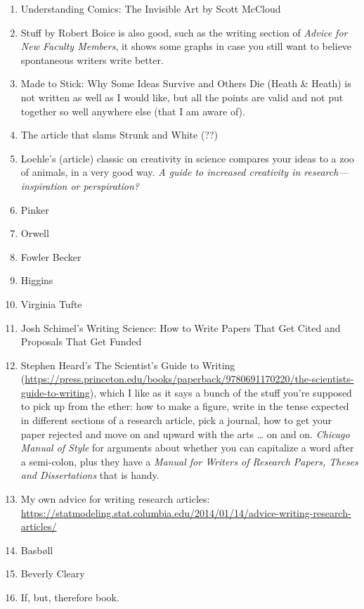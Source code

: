 \documentclass[11pt,letter]{article}
\begin{document}
\begin{enumerate}
\item Understanding Comics: The Invisible Art by Scott McCloud 
\item  Stuff by Robert Boice is also good, such as the writing section of \emph{Advice for New Faculty Members}, it shows some graphs in case you still want to believe spontaneous writers write better.
\item Made to Stick: Why Some Ideas Survive and Others Die (Heath \& Heath) is not written as well as I would like, but all the points are valid and not put together so well anywhere else (that I am aware of).
\item The article that slams Strunk and White (??)
\item Loehle's (article) classic on creativity in science compares your ideas to a zoo of animals, in a very good way. \emph{A guide to increased creativity in research---inspiration or perspiration?}
\item Pinker
\item Orwell
\item Fowler
\tem Becker
\item Higgins
\item Virginia Tufte 
\item Josh Schimel's Writing Science: How to Write Papers That Get Cited and Proposals That Get Funded
\item Stephen Heard’s The Scientist’s Guide to Writing (\url{https://press.princeton.edu/books/paperback/9780691170220/the-scientists-guide-to-writing}), which I like as it says a bunch of the stuff you’re supposed to pick up from the ether: how to make a figure, write in the tense expected in different sections of a research article, pick a journal, how to get your paper rejected and move on and upward with the arts … on and on. 
\emph{Chicago Manual of Style} for arguments about whether you can capitalize a word after a semi-colon, plus they have a \emph{Manual for Writers of Research Papers, Theses and Dissertations} that is handy.
\item My own advice for writing research articles:  \url{https://statmodeling.stat.columbia.edu/2014/01/14/advice-writing-research-articles/}
\item Basbøll 
\item Beverly Cleary 
\item If, but, therefore book. 
\end{enumerate}
\end{document}
